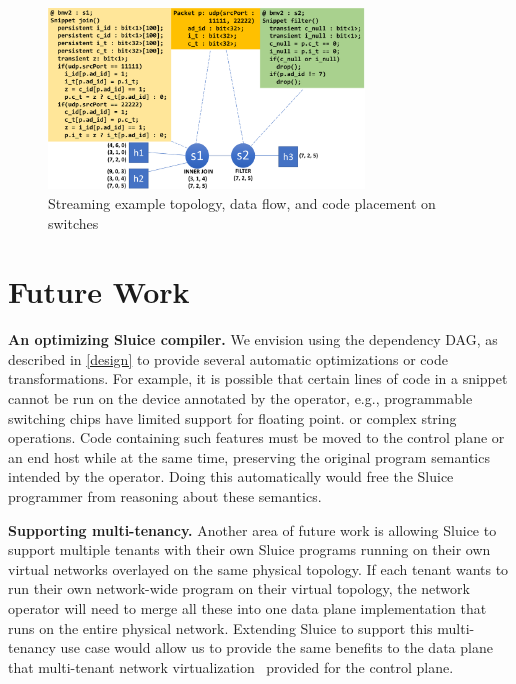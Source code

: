 \begin{figure}[tp]
\centering
\includegraphics[width=84mm]{figures/streaming_example}
\caption{Streaming example topology, data flow, and code placement on switches}
\vspace{-5mm}
\end{figure}
\vspace{-3mm}


\section{Future Work}
\textbf{An optimizing Sluice compiler.} We envision using the dependency DAG, as described in \ref{design} to
provide several automatic optimizations or code transformations. For example,
it is possible that certain lines of code in a snippet cannot be run on the
device annotated by the operator, e.g., programmable switching chips have
limited support for floating point. or complex string operations. Code
containing such features must be moved to the control plane or an end host while at the same time, preserving the original program semantics intended by the operator. Doing this automatically would free the Sluice programmer from reasoning about these semantics.

\textbf{Supporting multi-tenancy.} Another area of future work is allowing
Sluice to support multiple tenants with their own Sluice
programs running on their own virtual networks overlayed on the same physical
topology. If each tenant wants to run their own network-wide program on their
virtual topology, the network operator will need to merge all these into one
data plane implementation that runs on the entire physical network. Extending
Sluice to support this multi-tenancy use case would allow us to provide the
same benefits to the data plane that multi-tenant network
virtualization~\cite{multitenant} provided for the control plane.\\



